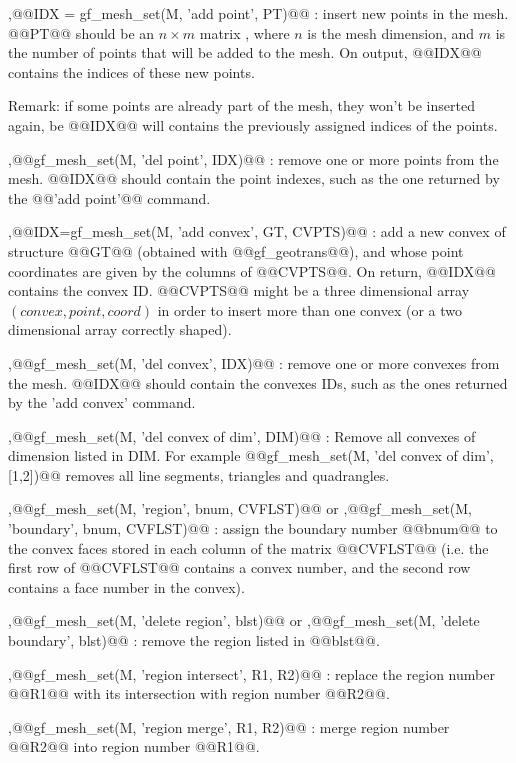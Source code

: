 \begin{cmddescription}
  \sep{@@IDX = gf\_mesh\_set(M, 'add point', PT)@@} : insert new
  points in the mesh. @@PT@@ should be an $n\times m$ matrix , where $n$ is
  the mesh dimension, and $m$ is the number of points that will be added
  to the mesh. On output, @@IDX@@ contains the indices of these new
  points. 

  Remark: if some points are already part of the mesh, they won't
  be inserted again, be @@IDX@@ will contains the previously assigned
  indices of the points.

  \sep{@@gf\_mesh\_set(M, 'del point', IDX)@@} :
  remove one or more points from the mesh. @@IDX@@ should contain the 
  point indexes, such as the one returned by the @@'add point'@@ command.
  
  \sep{@@IDX=gf\_mesh\_set(M, 'add convex', GT, CVPTS)@@} : add a new
  convex of structure @@GT@@ (obtained with @@gf\_geotrans@@), and
  whose point coordinates are given by the columns of @@CVPTS@@. On
  return, @@IDX@@ contains the convex ID.  @@CVPTS@@ might be a three
  dimensional array $(convex, point, coord)$ in order to insert more
  than one convex (or a two dimensional array correctly shaped).

  \sep{@@gf\_mesh\_set(M, 'del convex', IDX)@@} : 
  remove one or more convexes from the mesh. @@IDX@@ should contain the 
  convexes IDs, such as the ones returned by the 'add convex' command.
  
  \sep{@@gf\_mesh\_set(M, 'del convex of dim', DIM)@@} :
  Remove all convexes of dimension listed in DIM. For example
  @@gf\_mesh\_set(M, 'del convex of dim', [1,2])@@ removes all line
  segments, triangles and quadrangles.

  \sep{@@gf\_mesh\_set(M, 'region', bnum, CVFLST)@@} or
  \sep{@@gf\_mesh\_set(M, 'boundary', bnum, CVFLST)@@} :  assign the boundary number @@bnum@@ to the convex faces
  stored in each column of the matrix @@CVFLST@@ (i.e. the first row
  of @@CVFLST@@ contains a convex number, and the second row contains
  a face number in the convex).

  \sep{@@gf\_mesh\_set(M, 'delete region', blst)@@} or \sep{@@gf\_mesh\_set(M, 'delete boundary', blst)@@} :
  remove the region listed in @@blst@@.

  \sep{@@gf\_mesh\_set(M, 'region intersect', R1, R2)@@} : 
  replace the region number @@R1@@ with its intersection with region number @@R2@@.

  \sep{@@gf\_mesh\_set(M, 'region merge', R1, R2)@@} : 
  merge region number @@R2@@ into region number @@R1@@.


\end{cmddescription}
